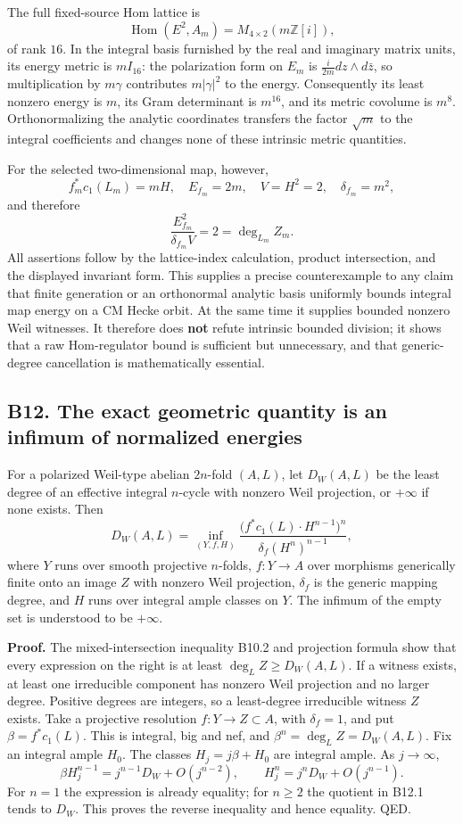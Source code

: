 \documentclass[11pt,a4paper]{article}
\theoremstyle{definition}
\begin{document}
The full fixed-source Hom lattice is \[
 \operatorname{Hom}(E^2,A_m)=M_{4\times2}(m\mathbb Z[i]),
\] of rank \(16\). In the integral basis furnished by the real and imaginary matrix units, its energy metric is \(m I_{16}\): the polarization form on \(E_m\) is \(\frac{i}{2m}dz\wedge d\bar z\), so multiplication by \(m\gamma\) contributes \(m|\gamma|^2\) to the energy. Consequently its least nonzero energy is \(m\), its Gram determinant is \(m^{16}\), and its metric covolume is \(m^8\). Orthonormalizing the analytic coordinates transfers the factor \(\sqrt m\) to the integral coefficients and changes none of these intrinsic metric quantities.

For the selected two-dimensional map, however, \[
 f_m^*c_1(L_m)=mH,\quad
 E_{f_m}=2m,\quad V=H^2=2,\quad \delta_{f_m}=m^2,
\] and therefore \[
 \frac{E_{f_m}^2}{\delta_{f_m}V}=2=\deg_{L_m}Z_m.
\] All assertions follow by the lattice-index calculation, product intersection, and the displayed invariant form. This supplies a precise counterexample to any claim that finite generation or an orthonormal analytic basis uniformly bounds integral map energy on a CM Hecke orbit. At the same time it supplies bounded nonzero Weil witnesses. It therefore does \textbf{not} refute intrinsic bounded division; it shows that a raw Hom-regulator bound is sufficient but unnecessary, and that generic-degree cancellation is mathematically essential.

\subsection{B12. The exact geometric quantity is an infimum of normalized energies}\label{b12.-the-exact-geometric-quantity-is-an-infimum-of-normalized-energies}

For a polarized Weil-type abelian \(2n\)-fold \((A,L)\), let \(D_W(A,L)\) be the least degree of an effective integral \(n\)-cycle with nonzero Weil projection, or \(+\infty\) if none exists. Then \[
 D_W(A,L)=\inf_{(Y,f,H)}
 \frac{\bigl(f^*c_1(L)\cdot H^{n-1}\bigr)^n}
 {\delta_f (H^n)^{n-1}},
\tag{B12.1}
\] where \(Y\) runs over smooth projective \(n\)-folds, \(f:Y\to A\) over morphisms generically finite onto an image \(Z\) with nonzero Weil projection, \(\delta_f\) is the generic mapping degree, and \(H\) runs over integral ample classes on \(Y\). The infimum of the empty set is understood to be \(+\infty\).

\textbf{Proof.} The mixed-intersection inequality B10.2 and projection formula show that every expression on the right is at least \(\deg_L Z\ge D_W(A,L)\). If a witness exists, at least one irreducible component has nonzero Weil projection and no larger degree. Positive degrees are integers, so a least-degree irreducible witness \(Z\) exists. Take a projective resolution \(f:Y\to Z\subset A\), with \(\delta_f=1\), and put \(\beta=f^*c_1(L)\). This is integral, big and nef, and \(\beta^n=\deg_L Z=D_W(A,L)\). Fix an integral ample \(H_0\). The classes \(H_j=j\beta+H_0\) are integral ample. As \(j\to\infty\), \[
 \beta H_j^{n-1}=j^{n-1}D_W+O(j^{n-2}),\qquad
 H_j^n=j^nD_W+O(j^{n-1}).
\] For \(n=1\) the expression is already equality; for \(n\ge2\) the quotient in B12.1 tends to \(D_W\). This proves the reverse inequality and hence equality. QED.
\end{document}
